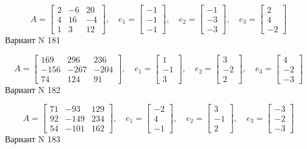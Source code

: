 \documentclass[11pt]{report}
\begin{document}
$$A = \left[\begin{matrix}2 & -6 & 20\\4 & 16 & -4\\1 & 3 & 12\end{matrix}\right],\quad e_1 = \left[\begin{matrix}-1\\-1\\-1\end{matrix}\right],\quad e_2 = \left[\begin{matrix}-1\\-3\\-3\end{matrix}\right],\quad e_3 = \left[\begin{matrix}2\\4\\-2\end{matrix}\right]$$Вариант N 181

$$A = \left[\begin{matrix}169 & 296 & 236\\-156 & -267 & -204\\74 & 124 & 91\end{matrix}\right],\quad e_1 = \left[\begin{matrix}1\\-1\\3\end{matrix}\right],\quad e_2 = \left[\begin{matrix}3\\-2\\2\end{matrix}\right],\quad e_3 = \left[\begin{matrix}4\\-2\\-3\end{matrix}\right]$$Вариант N 182

$$A = \left[\begin{matrix}71 & -93 & 129\\92 & -149 & 234\\54 & -101 & 162\end{matrix}\right],\quad e_1 = \left[\begin{matrix}-2\\4\\-1\end{matrix}\right],\quad e_2 = \left[\begin{matrix}3\\-1\\2\end{matrix}\right],\quad e_3 = \left[\begin{matrix}-3\\-2\\-3\end{matrix}\right]$$Вариант N 183
\end{document}
